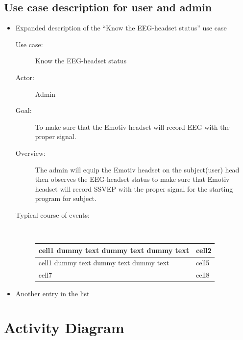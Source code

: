 \subsection{Use case description for user and admin}
\begin{itemize}
	\item Expanded description of the “Know the EEG-headset status” use case
	\begin{description}
		\item [Use case:]Know the EEG-headset status 
		\item [Actor:]Admin 
		\item [Goal:]To make sure that the Emotiv headset will record EEG with the proper signal. 
		\item[Overview:]The admin will equip the Emotiv headset on the subject(user) head then observes the EEG-headset status to make sure that Emotiv headset will record SSVEP with the proper signal for the starting program for subject.	
		\item[Typical course of events:] \\
		{
		\begin{center}
			\begin{tabular}{ | m{7cm}| m{7cm} | } 
				\hline
				cell1 dummy text dummy text dummy text& cell2  \\ 
				\hline
				cell1 dummy text dummy text dummy text & cell5  \\ 
				\hline
				cell7 & cell8  \\ 
				\hline
			\end{tabular}
		\end{center}
	}
		
	\end{description}
	\item Another entry in the list
\end{itemize}


\section{Activity Diagram}

